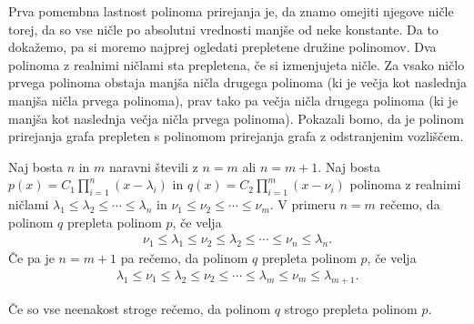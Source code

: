 Prva pomembna lastnost polinoma prirejanja je, da znamo omejiti njegove ničle torej, da so vse ničle po absolutni vrednosti manjše od neke konstante. Da to dokažemo, pa si moremo najprej ogledati prepletene družine polinomov. Dva polinoma z realnimi ničlami sta prepletena, če si izmenjujeta ničle. Za vsako ničlo prvega polinoma obstaja manjša ničla drugega polinoma (ki je večja kot naslednja manjša ničla prvega polinoma), prav tako pa večja ničla drugega polinoma (ki je manjša kot naslednja večja ničla prvega polinoma). Pokazali bomo, da je polinom prirejanja grafa prepleten s polinomom prirejanja grafa z odstranjenim vozliščem.

\begin{definicija}\label{prepletena-polinoma}
    Naj bosta \(n\) in \(m\) naravni števili z \(n=m\) ali \(n=m+1\). Naj bosta \(p(x) = C_1 \prod_{i=1}^n (x-\lambda_i)\) in \(q(x) = C_2 \prod_{i=1}^m (x-\nu_i)\) polinoma z realnimi ničlami \(\lambda_1 \leq \lambda_2 \leq \cdots \leq \lambda_n\) in \(\nu_1 \leq \nu_2 \leq \cdots \leq \nu_m\). V primeru \(n=m\) rečemo, da polinom \(q\) prepleta polinom \(p\), če velja
    \begin{align*}
        \nu_1 \leq \lambda_1 \leq \nu_2 \leq \lambda_2 \leq \cdots \leq \nu_n \leq \lambda_n.
    \end{align*}
    Če pa je \(n=m+1\) pa rečemo, da polinom \(q\) prepleta polinom \(p\), če velja
    \begin{align*}
        \lambda_1 \leq \nu_1 \leq \lambda_2 \leq \nu_2 \leq \cdots \leq \lambda_m \leq \nu_m \leq \lambda_{m+1}.
    \end{align*}

    Če so vse neenakost stroge rečemo, da polinom \(q\) strogo prepleta polinom \(p\).
\end{definicija}

